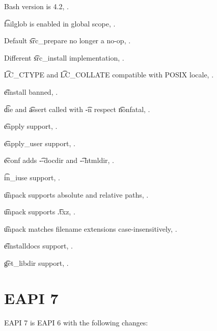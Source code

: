 \begin{compactitem}
\item Bash version is 4.2, .
\item \t{failglob} is enabled in global scope, .
\item Default \t{src_prepare} no longer a no-op, .
\item Different \t{src_install} implementation, .
\item \t{LC_CTYPE} and \t{LC_COLLATE} compatible with POSIX locale, .
\item \t{einstall} banned, .
\item \t{die} and \t{assert} called with \t{-n} respect \t{nonfatal}, .
\item \t{eapply} support, .
\item \t{eapply_user} support, .
\item \t{econf} adds \t{-{}-docdir} and \t{-{}-htmldir}, .
\item \t{in_iuse} support, .
\item \t{unpack} supports absolute and relative paths, .
\item \t{unpack} supports \t{.txz}, .
\item \t{unpack} matches filename extensions case-insensitively, .
\item \t{einstalldocs} support, .
\item \t{get_libdir} support, .
\end{compactitem}

\section*{EAPI 7}

EAPI 7 is EAPI 6 with the following changes:

